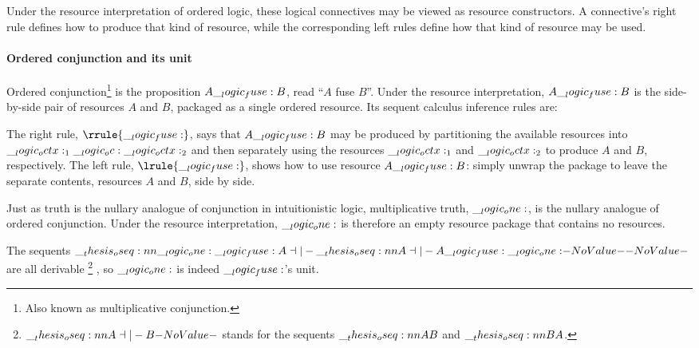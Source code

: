 Under the resource interpretation of ordered logic, these logical connectives may be viewed as resource constructors.
A connective's right rule defines how to produce that kind of resource, while the corresponding left rules define how that kind of resource may be used.

\paragraph*{Ordered conjunction and its unit}
Ordered conjunction\footnote{Also known as multiplicative conjunction.} is the proposition $A \__logic_fuse: B$, read \enquote{$A$ fuse $B$}.
Under the resource interpretation, $A \__logic_fuse: B$ is the side-by-side pair of resources $A$ and $B$, packaged as a single ordered resource.
Its sequent calculus inference rules are:
The right rule, $\rrule{\fuse}$, says that $A \__logic_fuse: B$ may be produced by partitioning the available resources into $\__logic_octx:_1 \__logic_oc: \__logic_octx:_2$ and then separately using the resources $\__logic_octx:_1$ and $\__logic_octx:_2$ to produce $A$ and $B$, respectively.
The left rule, $\lrule{\fuse}$, shows how to use resource $A \__logic_fuse: B$: simply unwrap the package to leave the separate contents, resources $A$ and $B$, side by side.

Just as truth is the nullary analogue of conjunction in intuitionistic logic, multiplicative truth, $\__logic_one:$, is the nullary analogue of ordered conjunction.
Under the resource interpretation, $\__logic_one:$ is therefore an empty resource package that contains no resources.
The sequents $\oseq{\one \fuse A \dashv|- \oseq{A \dashv|- A \fuse \one}}$ are all derivable%
\footnote{$\oseq{A \dashv|- B}$ stands for the sequents $\oseq{A |- B}$ and $\oseq{B |- A}$.}%
, so $\__logic_one:$ is indeed $\__logic_fuse:$'s unit.%

